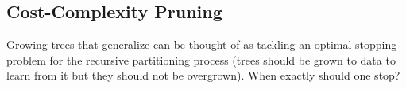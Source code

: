 \subsection{Cost-Complexity Pruning}
\label{CostComplexityPruning}
Growing trees that generalize can be thought of as tackling an optimal stopping problem for the recursive partitioning process (trees should be grown to data to learn from it but they should not be overgrown). When exactly should one stop? \\

